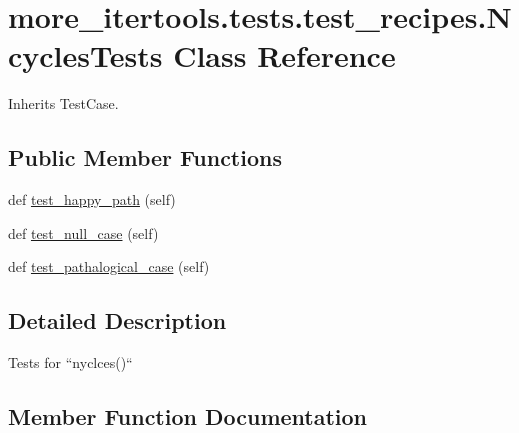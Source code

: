 \hypertarget{classmore__itertools_1_1tests_1_1test__recipes_1_1_ncycles_tests}{}\section{more\+\_\+itertools.\+tests.\+test\+\_\+recipes.\+Ncycles\+Tests Class Reference}
\label{classmore__itertools_1_1tests_1_1test__recipes_1_1_ncycles_tests}


Inherits Test\+Case.

\subsection*{Public Member Functions}
\begin{DoxyCompactItemize}
\item 
def \hyperlink{classmore__itertools_1_1tests_1_1test__recipes_1_1_ncycles_tests_abee04540b3bd88cf412b076da7f7af27}{test\+\_\+happy\+\_\+path} (self)
\item 
def \hyperlink{classmore__itertools_1_1tests_1_1test__recipes_1_1_ncycles_tests_ad3e5475efd91411aeb9d8d2d664ef1bd}{test\+\_\+null\+\_\+case} (self)
\item 
def \hyperlink{classmore__itertools_1_1tests_1_1test__recipes_1_1_ncycles_tests_a21b101a86aee325912be178b12ea62d9}{test\+\_\+pathalogical\+\_\+case} (self)
\end{DoxyCompactItemize}


\subsection{Detailed Description}
\begin{DoxyVerb}Tests for ``nyclces()``\end{DoxyVerb}
 

\subsection{Member Function Documentation}
\mbox{\label{classmore__itertools_1_1tests_1_1test__recipes_1_1_ncycles_tests_abee04540b3bd88cf412b076da7f7af27}} 
